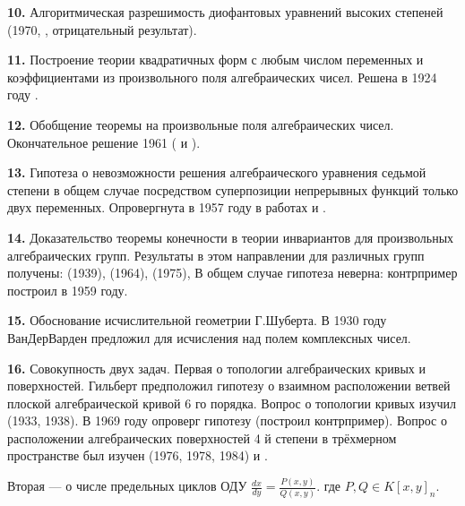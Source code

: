 \documentclass[a4paper,oneside,fleqn,10pt]{article}
\begin{document}
\medskip

\textbf{10.} Алгоритмическая разрешимость диофантовых уравнений высоких степеней
(1970, , отрицательный результат).

\medskip

\textbf{11.} Построение теории квадратичных форм с любым числом переменных и коэффициентами
из произвольного поля алгебраических чисел. Решена в 1924 году .

\medskip

\textbf{12.} Обобщение теоремы   на произвольные поля алгебраических чисел.
Окончательное решение 1961 ( и ).

\medskip

\textbf{13.} Гипотеза о невозможности решения алгебраического уравнения седьмой степени
в общем случае посредством суперпозиции непрерывных функций только двух переменных.
Опровергнута в 1957 году в работах  и .

\medskip

\textbf{14.} Доказательство теоремы конечности в теории инвариантов для произвольных алгебраических
групп. Результаты в этом направлении для различных групп
получены:  (1939),  (1964),  (1975),
В общем случае гипотеза неверна: контрпример построил  в 1959 году.

\medskip

\textbf{15.} Обоснование исчислительной геометрии Г.Шуберта. В 1930 году
ВанДерВарден предложил для исчисления над полем комплексных чисел.

\medskip

\textbf{16.} Совокупность двух задач. Первая о топологии алгебраических
кривых и поверхностей. Гильберт предположил гипотезу о взаимном расположении
ветвей плоской алгебраической кривой 6 го порядка.
Вопрос о топологии кривых изучил  (1933, 1938).
В 1969 году  опроверг гипотезу (построил контрпример).
Вопрос о расположении алгебраических поверхностей 4 й степени
в трёхмерном пространстве был изучен  (1976, 1978, 1984) и .

Вторая --- о числе предельных циклов ОДУ $\frac{dx}{dy} = \frac{P(x,y)}{Q(x,y)}$.
где $P,Q \in K[x,y]_n$.

\medskip
\end{document}
